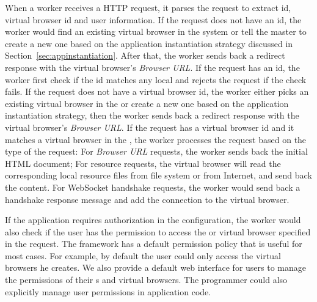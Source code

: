 
When a worker receives a HTTP request, it parses the request to extract
\appins id, virtual browser id and user information. If the request does not
have an \appins id, the worker would find an existing virtual browser in the
system or tell the master to create a new one  based on the application
instantiation strategy discussed in Section~\ref{sec:appinstantiation}. After
that, the worker sends back a redirect response with the virtual browser's
\emph{Browser URL}. If the request has an \appins id, the worker first check
if the id matches any local \appins and rejects the request if the check
fails. If the request does not have a virtual browser id, the worker either
picks an existing virtual browser in the \appins  or create a new one based on
the application instantiation strategy, then the worker sends back a redirect
response with  the virtual browser's \emph{Browser URL}. If the request has a
virtual browser id and it matches a virtual browser in the \appins, the worker
processes the request based on the type of the request: For \emph{Browser URL}
requests, the worker sends back the initial  HTML document; For resource
requests, the virtual browser will read the corresponding local resource files
from file system or from Internet, and send back the content. For WebSocket
handshake requests, the worker would send back a handshake response message
and add the connection to the virtual browser.


If the application requires authorization in the configuration, the
worker would also check if the user has the permission to access the \appins
or virtual browser specified in the request. The framework has a default
permission policy that is useful for most cases. For example, by default the
user could only access the virtual browsers he creates. We also provide a
default web interface for users to manage the permissions of their \appins{}s
and virtual browsers. The programmer could also explicitly manage user
permissions in application code.
